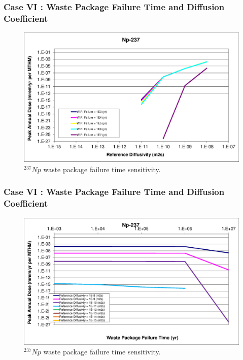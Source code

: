 \begin{frame}[c]
  \frametitle{Case VI : Waste Package Failure Time and Diffusion Coefficient}

\begin{figure}[ht!]
\centering
\includegraphics[width=\linewidth]{WPFailExtended/Np-237.eps}
\caption{$^{237}Np$ waste package failure time sensitivity. }
\label{fig:WPFailNp237}
\end{figure}
\end{frame}

\begin{frame}[c]
  \frametitle{Case VI : Waste Package Failure Time and Diffusion Coefficient}

\begin{figure}[ht!]
\centering
\includegraphics[width=\linewidth]{WPFailExtended/Np-237-WPFail.eps}
\caption{$^{237}Np$ waste package failure time sensitivity. }
\label{fig:WPFailPuDaughters}
\end{figure}
\end{frame}

